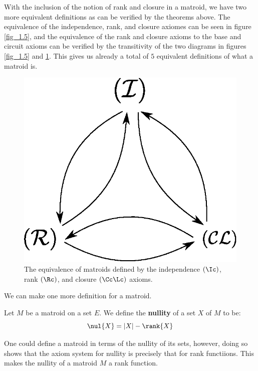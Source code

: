 With the inclusion of the notion of rank and closure in a matroid, we have two
more equivalent definitions as can be verified by the theorems above. The
equivalence of the independence, rank, and closure axiomes can be seen in
figure \ref{fig_1.5}, and the equivalence of the rank and closure axioms to the
base and circuit axioms can be verified by the transitivity of the two diagrams
in figures \ref{fig_1.5} and \ref{fig_1.8}. This gives us already a total of $5$
equivalent definitions of what a matroid is.

\begin{figure}[h]
    \centering
    \includegraphics[scale=0.5]{Figures/chapter1/equiv_def_2.eps}
    \caption{The equivalence of matroids defined by the independence $(\Ic)$,
    rank $(\Rc)$, and closure $(\Cc\Lc)$ axioms.}
    \label{fig_1.8}
\end{figure}

We can make one more definition for a matroid.

\begin{definition}
    Let $M$ be a matroid on a set  $E$. We define the  \textbf{nullity} of a set
    $X$ of  $M$ to be:
    \begin{equation*}
        \nul{X}=|X|-\rank{X}
    \end{equation*}
\end{definition}

One could define a matroid in terms of the nullity of its sets, however, doing
so shows that the axiom system for nullity is precisely that for rank
functiions. This makes the nullity of a matroid $M$ a rank function.
